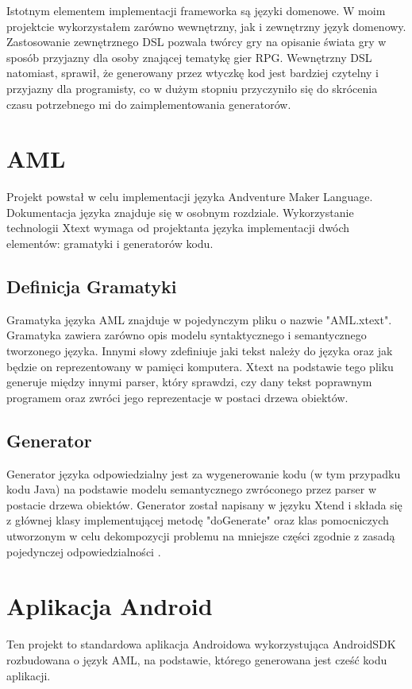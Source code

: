 \documentclass	{xmgr}
\begin{document}
Istotnym elementem implementacji frameworka są języki domenowe. W moim projektcie wykorzystałem zarówno wewnętrzny, jak i zewnętrzny język domenowy. Zastosowanie zewnętrznego DSL pozwala twórcy gry na opisanie świata gry w sposób przyjazny dla osoby znającej tematykę gier RPG. Wewnętrzny DSL natomiast, sprawił, że generowany przez wtyczkę kod jest bardziej czytelny i przyjazny dla programisty, co w dużym stopniu przyczyniło się do skrócenia czasu potrzebnego mi do zaimplementowania generatorów.

\section{AML} 
Projekt powstał w celu implementacji języka Andventure Maker Language. Dokumentacja języka znajduje się w osobnym rozdziale. Wykorzystanie technologii Xtext \cite{Xtext:2017:Doc} wymaga od projektanta języka implementacji dwóch elementów: gramatyki i generatorów kodu. 

\subsection{Definicja Gramatyki} 

Gramatyka języka AML znajduje w pojedynczym pliku o nazwie "AML.xtext". Gramatyka zawiera zarówno opis modelu syntaktycznego i semantycznego tworzonego języka. Innymi słowy zdefiniuje jaki tekst należy do języka oraz jak będzie on reprezentowany w pamięci komputera. Xtext na podstawie tego pliku generuje między innymi parser, który sprawdzi, czy dany tekst poprawnym programem oraz zwróci jego reprezentacje w postaci drzewa obiektów.

\subsection{Generator}
Generator języka odpowiedzialny jest za wygenerowanie kodu (w tym przypadku kodu Java) na podstawie modelu semantycznego zwróconego przez parser w postacie drzewa obiektów. Generator został napisany w języku Xtend i składa się z głównej klasy implementującej metodę "doGenerate" oraz klas pomocniczych utworzonym w celu dekompozycji problemu na mniejsze części zgodnie z zasadą pojedynczej odpowiedzialności \cite{CleanCode:2005}.

\section{Aplikacja Android}
Ten projekt to standardowa aplikacja Androidowa wykorzystująca AndroidSDK rozbudowana o język AML, na podstawie, którego generowana jest cześć kodu aplikacji.
\end{document}
